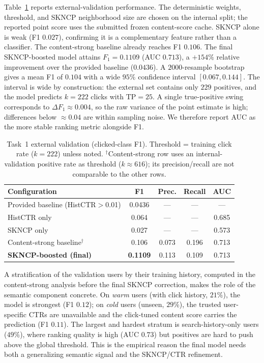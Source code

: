 \documentclass[sigconf, nonacm]{acmart}
\begin{document}
Table~\ref{tab:task1-results} reports external-validation performance. The
deterministic weights, threshold, and SKNCP neighborhood size are chosen on the
internal split; the reported point score uses the submitted frozen content-score
cache. SKNCP alone is weak (F1 $0.027$), confirming it is a complementary
feature rather than a classifier. The content-strong baseline already reaches
F1 $0.106$. The final SKNCP-boosted model attains
$F_1=0.1109$ (AUC $0.713$), a $+154\%$ relative improvement over the provided
baseline ($0.0436$). A $2000$-resample bootstrap gives a mean F1 of $0.104$ with
a wide $95\%$ confidence interval $[0.067,0.144]$.  The interval is wide by
construction: the external set contains only $229$ positives, and the model
predicts $k=222$ clicks with $\mathrm{TP}=25$.  A single true-positive swing
corresponds to $\Delta F_1\!\approx\!0.004$, so the raw variance of the point
estimate is high; differences below $\approx\!0.04$ are within sampling noise.
We therefore report AUC as the more stable ranking metric alongside F1.

\begin{table}[t]
\centering
\caption{Task~1 external validation (clicked-class F1). Threshold = training
click rate ($k{=}222$) unless noted. $^\dagger$Content-strong row uses an
internal-validation positive rate as threshold ($k{\approx}616$); its
precision/recall are not comparable to the other rows.}
\label{tab:task1-results}
\small
\setlength{\tabcolsep}{4pt}
\begin{tabular}{lcccc}
\toprule
Configuration & F1 & Prec. & Recall & AUC \\
\midrule
Provided baseline (HistCTR$>$0.01) & 0.0436 & --- & --- & --- \\
HistCTR only & 0.064 & --- & --- & 0.685 \\
SKNCP only & 0.027 & --- & --- & 0.573 \\
Content-strong baseline$^\dagger$ & 0.106 & 0.073 & 0.196 & 0.713 \\
\textbf{SKNCP-boosted (final)} & \textbf{0.1109} & 0.113 & 0.109 & 0.713 \\
\bottomrule
\end{tabular}
\end{table}

A stratification of the validation users by their training history, computed in
the content-strong analysis before the final SKNCP correction, makes the role of
the semantic component concrete. On \emph{warm} users (with click history,
$21\%$), the model is strongest (F1 $0.12$); on \emph{cold} users (unseen,
$29\%$), the trusted user-specific CTRs are unavailable and the click-tuned
content score carries the prediction (F1 $0.11$). The largest and hardest
stratum is search-history-only users ($49\%$), where ranking quality is high
(AUC $0.73$) but positives are hard to push above the global threshold. This is
the empirical reason the final model needs both a generalizing semantic signal
and the SKNCP/CTR refinement.
\end{document}
